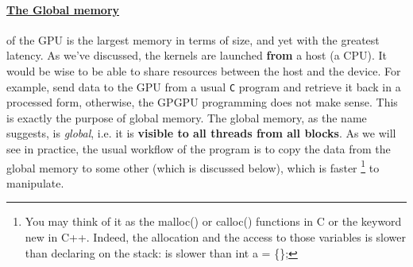 \vspace{-15pt}
\paragraph{\underline{The Global memory}} of the GPU is the largest memory in terms of size, and yet with the greatest latency.
As we've discussed, the kernels are launched \textbf{from} a host (a CPU). It would be wise to be able to share 
resources between the host and the device. For example, send data to the GPU from a usual \verb|C| program
and retrieve it back in a processed form, otherwise, the GPGPU programming does not make sense. 
This is exactly the purpose of global memory. The global memory, as the 
name suggests, is \textsl{global}, i.e. it is \textbf{visible to all threads from all blocks}. As we will see in practice,
the usual workflow of the program is to copy the data from the global memory to some other (which is discussed below), 
which is faster \footnote{You may think of it as the {\selectfont malloc()} or {\selectfont calloc()} functions in C
or the keyword {\selectfont new} in C++. Indeed, the allocation and the access to those variables is slower than 
declaring on the stack: is slower than {\selectfont int a = \{\};}}  
to manipulate. 

\vspace{-15pt}

